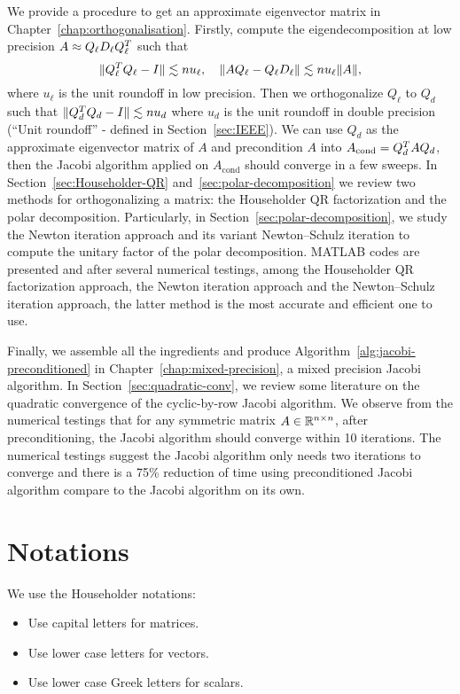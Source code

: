 We provide a procedure to get an approximate eigenvector matrix in
Chapter~\ref{chap:orthogonalisation}. Firstly, compute the
eigendecomposition at low precision $A \approx Q_\ell D_\ell Q_\ell^T$
such that
\begin{equation}\notag
  \|{Q_\ell^T Q_\ell - I}\| \lesssim nu_\ell,\quad \|{AQ_\ell -
  Q_\ell D_\ell}\|\lesssim nu_\ell  \|{A}\|,
\end{equation}
where $u_\ell$ is the unit roundoff in low precision. Then we orthogonalize
$Q_\ell$ to $Q_d$ such that $\|{Q_d^T Q_d - I}\| \lesssim nu_d$ where
$u_d$ is the unit roundoff in double precision (``Unit roundoff'' - defined
in Section~\ref{sec:IEEE}). We can use $Q_d$ as the approximate eigenvector
matrix of $A$ and precondition $A$ into $A_{\text{cond}} = Q_d^T A Q_d$,
then the Jacobi algorithm applied on $A_{\text{cond}}$ should converge in a
few sweeps. In Section~\ref{sec:Householder-QR}
and~\ref{sec:polar-decomposition} we review two methods for orthogonalizing
a matrix: the Householder QR factorization and the polar decomposition.
Particularly, in Section~\ref{sec:polar-decomposition}, we study the Newton
iteration approach and its variant Newton--Schulz iteration to compute the
unitary factor of the polar decomposition. MATLAB codes are presented and
after several numerical testings, among the Householder QR factorization
approach, the Newton iteration approach and the Newton--Schulz iteration
approach, the latter method is the most accurate and efficient one to use.

Finally, we assemble all the ingredients and produce
Algorithm~\ref{alg:jacobi-preconditioned} in
Chapter~\ref{chap:mixed-precision}, a mixed precision Jacobi algorithm. In
Section~\ref{sec:quadratic-conv}, we review some literature on the
quadratic convergence of the cyclic-by-row Jacobi algorithm. We observe
from the numerical testings that for any symmetric matrix $A\in\mathbb{R}^{n\times n}$,
after preconditioning, the Jacobi algorithm should converge within 10
iterations. The numerical testings suggest the Jacobi algorithm only needs
two iterations to converge and there is a 75\% reduction of time using
preconditioned Jacobi algorithm compare to the Jacobi algorithm on its own.



\section{Notations}
We use the Householder notations:
\begin{itemize}
\item Use capital letters for matrices.
\item Use lower case letters for vectors.
\item Use lower case Greek letters for scalars.
\end{itemize}

